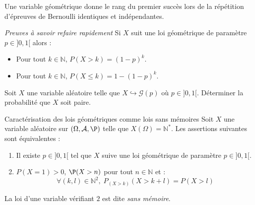 \documentclass[french,11pt,twoside]{VcCours}
\begin{document}
\begin{Remarque}{} Une variable  géométrique donne le rang du premier succès lors de la répétition d'épreuves de Bernoulli identiques et indépendantes.
\end{Remarque}

\begin{Proposition}{\emph{Preuves à savoir refaire rapidement}}
Si $X$ suit une loi géométrique de paramètre $p \in ]0,1[$ alors :
\begin{itemize}
\item Pour tout $k \in \mathbb{N}$, $P(X>k)=(1-p)^k$.
\item Pour tout $k \in \mathbb{N}$, $P(X \leq k)=1-(1-p)^k$.
%
\end{itemize}
\end{Proposition}

\begin{Demonstration}{}
\vspace{5cm}
\end{Demonstration}

\begin{ApplicationDirecte}{} Soit $X$ une variable aléatoire telle que $X \hookrightarrow \mathcal{G}(p)$ où $p \in ]0,1[$. Déterminer la probabilité que $X$ soit paire.
\end{ApplicationDirecte}

\begin{Proposition}{Caractérisation des lois géométriques comme lois sans mémoires}
Soit $X$ une variable aléatoire sur $(\Omega, \mathcal{A}, \P)$ telle que $X(\Omega) = \mathbb{N}^*$. Les assertions suivantes sont équivalentes :
\begin{enumerate}
\item Il existe $p \in ]0,1[$ tel que $X$ suive une loi géométrique de paramètre $p \in ]0,1[$.
\item $P(X=1)>0$, $\P(X>n)$ pour tout $n \in \mathbb{N}$ et :
$$ \forall (k,l) \in \mathbb{N}^2, \; P_{(X>k)}(X>k+l)=P(X>l)$$
\end{enumerate}
La loi d'une variable vérifiant $2$ est dite \emph{sans mémoire}.
\end{Proposition}

\begin{Demonstration}{}
\vspace{13cm}
\end{Demonstration}
\end{document}
